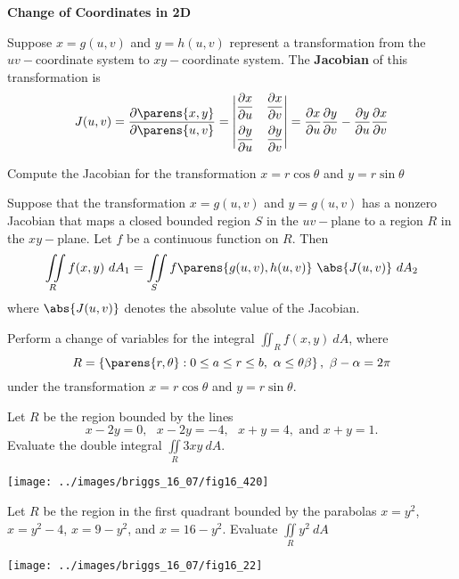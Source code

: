\documentclass[../mathNotesPreamble]{subfiles}
\begin{document}
\noindent\textbf{Change of Coordinates in 2D}
\begin{defn*}[Jacobian]
Suppose $x=g(u,v)$ and $y=h(u,v)$ represent a transformation from the $uv-$coordinate system to $xy-$coordinate system. The \textbf{Jacobian} of this transformation is 
\[
J(u,v)=\dfrac{\partial\parens{x,y}}{\partial\parens{u,v}}=\begin{vmatrix}
\dfrac{\partial x}{\partial u}&\dfrac{\partial x}{\partial v}\\[2ex]
\dfrac{\partial y}{\partial u}&\dfrac{\partial y}{\partial v}
\end{vmatrix}=\dfrac{\partial x}{\partial u}\dfrac{\partial y}{\partial v}-\dfrac{\partial y}{\partial u}\dfrac{\partial x}{\partial v}
\]
\end{defn*}
\begin{ex*}
Compute the Jacobian for the transformation $x=r\cos\theta$ and $y=r\sin\theta$
\end{ex*}
\pagebreak
\begin{thmBox*}
Suppose that the transformation $x=g(u,v)$ and $y=g(u,v)$ has a nonzero Jacobian that maps a closed bounded region $S$ in the $uv-$plane to a region $R$ in the $xy-$plane. Let $f$ be a continuous function on $R$. Then
\[
\iint\limits_R f(x,y)~dA_1=\iint\limits_S f\parens{g(u,v),h(u,v)}
~\abs{J(u,v)}~dA_2\]
where $\abs{J(u,v)}$ denotes the absolute value of the Jacobian.
\end{thmBox*}
\begin{ex*}
Perform a change of variables for the integral $\displaystyle\iint_Rf(x,y)~dA$, where 
\[
R=\left\{\parens{r,\theta}: 0\leq a\leq r\leq b,\text{ }\alpha\leq\theta\beta\right\},\text{ }\beta-\alpha=2\pi
\] 
under the transformation $x=r\cos\theta$ and $y=r\sin\theta$.
\end{ex*}
\pagebreak
\begin{ex*}
Let $R$ be the region bounded by the lines 
\[
x-2y=0,\text{ }x-2y=-4,\text{ }x+y=4,\text{ and }x+y=1.
\]
Evaluate the double integral $\displaystyle\iint\limits_R3xy~dA$.
\begin{flushleft}
\texttt{[image: ../images/briggs\_16\_07/fig16\_420]}
\end{flushleft}
\end{ex*}
  \pagebreak
  \begin{ex*}
  Let $R$ be the region in the first quadrant bounded by the parabolas $x=y^2$, $x=y^2-4$, $x=9-y^2$, and $x=16-y^2$. Evaluate $\displaystyle\iint\limits_R y^2~dA$
  \begin{flushleft}
  \texttt{[image: ../images/briggs\_16\_07/fig16\_22]}
  \end{flushleft}
  \end{ex*}
\end{document}
